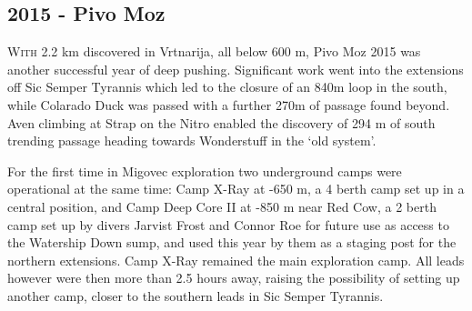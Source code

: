 \newpage
\begin{tcolorbox}
\chapter{2015 - Pivo Moz}
		\lettrine{W}{ith} 2.2 km discovered in Vrtnarija, all below 600 m, Pivo Moz 2015 was another successful year of deep pushing. Significant work went into the extensions off Sic Semper Tyrannis which led to the closure of an 840m loop in the south, while Colarado Duck was passed with a further 270m of passage found beyond. Aven climbing at Strap on the Nitro enabled the discovery of 294 m of south trending passage heading towards Wonderstuff in the ‘old system’. 

		For the first time in Migovec exploration two underground camps were operational at the same time: Camp X-Ray at -650 m, a 4 berth camp set up in a central position, and Camp Deep Core II at -850 m near Red Cow, a 2 berth camp set up by divers Jarvist Frost and Connor Roe for future use as access to the Watership Down sump, and used this year by them as a staging post for the northern extensions. Camp X-Ray remained the main exploration camp. All leads however were then more than 2.5 hours away, raising the possibility of setting up another camp, closer to the southern leads in Sic Semper Tyrannis.
		\\	
		\\
		\\
	

	

\end{tcolorbox}
\BgThispage



